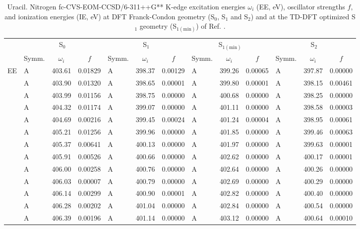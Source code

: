 \documentclass[journal=jctcce,manuscript=article]{achemso}
\begin{document}
\begin{table}
\caption{Uracil. Nitrogen fc-CVS-EOM-CCSD/6-311++G** K-edge excitation energies $\omega_i$ (EE, eV), oscillator strengths $f$, and ionization energies (IE, eV) at DFT Franck-Condon geometry (S$_0$, S$_1$ and S$_2$) and at the TD-DFT optimized S$_1$ geometry (S$_{1(\text{min})}$) of Ref. .
\label{Tab:Uracil_DFT:Nitrogen}}
\scriptsize
\begin{tabular}{l|lcc|lcc|lcc|lcc}
\cline{2-13}
& \multicolumn{3}{c|}{S$_0$}
& \multicolumn{3}{c|}{S$_1$}  
& \multicolumn{3}{c|}{S$_{1(\text{min})}$}
& \multicolumn{3}{c}{S$_2$}
\\
\cline{2-13}
& Symm. & $\omega_i$ & $f$ 
& Symm. & $\omega_i$ & $f$ 
& Symm. & $\omega_i$ & $f$ 
& Symm. & $\omega_i$ & $f$\\
\hline
  EE 
& A & 403.61 & 0.01829 & A & 398.37 & 0.00129 & A & 399.26 & 0.00065 & A & 397.87 & 0.00000 \\
& A & 403.90 & 0.01320 & A & 398.65 & 0.00001 & A & 399.80 & 0.00001 & A & 398.15 & 0.00461 \\
& A & 403.99 & 0.01156 & A & 398.75 & 0.00000 & A & 400.68 & 0.00000 & A & 398.25 & 0.00000 \\
& A & 404.32 & 0.01174 & A & 399.07 & 0.00000 & A & 401.11 & 0.00000 & A & 398.58 & 0.00003 \\
& A & 404.69 & 0.00216 & A & 399.45 & 0.00024 & A & 401.24 & 0.00004 & A & 398.95 & 0.00061 \\
& A & 405.21 & 0.01256 & A & 399.96 & 0.00000 & A & 401.85 & 0.00000 & A & 399.46 & 0.00063 \\
& A & 405.37 & 0.00641 & A & 400.13 & 0.00000 & A & 401.97 & 0.00000 & A & 399.63 & 0.00001 \\
& A & 405.91 & 0.00526 & A & 400.66 & 0.00000 & A & 402.62 & 0.00000 & A & 400.17 & 0.00001 \\
& A & 406.00 & 0.00258 & A & 400.76 & 0.00000 & A & 402.64 & 0.00000 & A & 400.26 & 0.00000 \\
& A & 406.03 & 0.00007 & A & 400.79 & 0.00000 & A & 402.69 & 0.00000 & A & 400.29 & 0.00000 \\
& A & 406.14 & 0.00299 & A & 400.90 & 0.00001 & A & 402.82 & 0.00000 & A & 400.40 & 0.00000 \\
& A & 406.28 & 0.00202 & A & 401.04 & 0.00000 & A & 402.84 & 0.00000 & A & 400.54 & 0.00000 \\
& A & 406.39 & 0.00196 & A & 401.14 & 0.00000 & A & 403.12 & 0.00000 & A & 400.64 & 0.00010 \\

\end{tabular}
\end{table}
\end{document}

